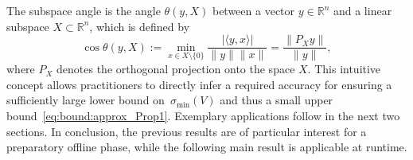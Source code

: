 \documentclass[a4paper, reqno]{amsart}
\newcommand{\R}{\ensuremath{\mathbb R}}
\begin{document}
The subspace angle is the angle $\theta(y,X)$ between a vector $y\in\R^n$ and a linear subspace $X\subset \R^n$, which is defined by
\begin{equation}
    \cos \theta(y,X) := \min_{x\in X\setminus\{0\}} \frac{\lvert\langle y, x\rangle\rvert}{\lVert y\rVert \lVert x\rVert} = \frac{\lVert P_X y\rVert}{\lVert y\rVert},
\end{equation}
where $P_X$ denotes the orthogonal projection onto the space $X$.
This intuitive concept allows practitioners to directly infer a required accuracy for ensuring a sufficiently large lower bound on~$\sigma_\mathrm{min}(V)$ and thus a small upper bound~\eqref{eq:bound:approx_Prop1}. Exemplary applications follow in the next two sections. %
In conclusion, the previous results are of particular interest for a preparatory offline phase, while the following main result is applicable at runtime.
\end{document}
